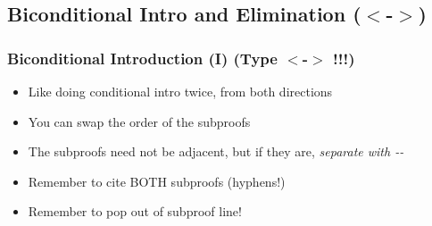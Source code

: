 \begin{frame}
  \begin{fitchproof}
    \open
     
    \open
     
    \open
     
    \close
    \close
    \close
  \end{fitchproof}
\end{frame}






\subsection{Biconditional Intro and Elimination ($<$-$>$)} 

\begin{frame}
  \frametitle{Biconditional  Introduction (\eiff I)    (Type $<$-$>$ !!!)}
  
\begin{multicols}{2}

\begin{center}
    \begin{fitchproof}
\open
		 
		\ellipsesline
	\close
\breakline
	\open
		 
		\ellipsesline
	\close
    \end{fitchproof}
    \end{center}
   
   \columnbreak
    
\begin{center}
 \begin{itemize}[<+->]

\item Like doing conditional intro twice, from both directions

\item You can swap the order of the subproofs

\item The subproofs need not be adjacent, but if they are, \emph{separate with -{}-}

\item Remember to cite BOTH subproofs (hyphens!)

\item Remember to pop out of subproof line!

\end{itemize}

  \end{center}
\end{multicols}

\end{frame}

